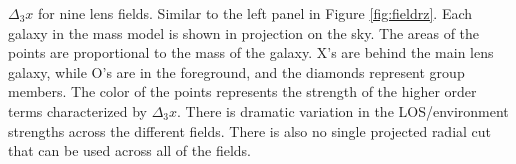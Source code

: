 \label{fig:allfields} $\Delta_3x$ for nine lens fields. Similar to the left panel in Figure \ref{fig:fieldrz}. Each galaxy in the mass model is shown in projection on the sky. The areas of the points are proportional to the mass of the galaxy. X's are behind the main lens galaxy, while O's are in the foreground, and the diamonds represent group members. The color of the points represents the strength of the higher order terms characterized by $\Delta_3 x$. There is dramatic variation in the LOS/environment strengths across the different fields. There is also no single projected radial cut that can be used across all of the fields.
  